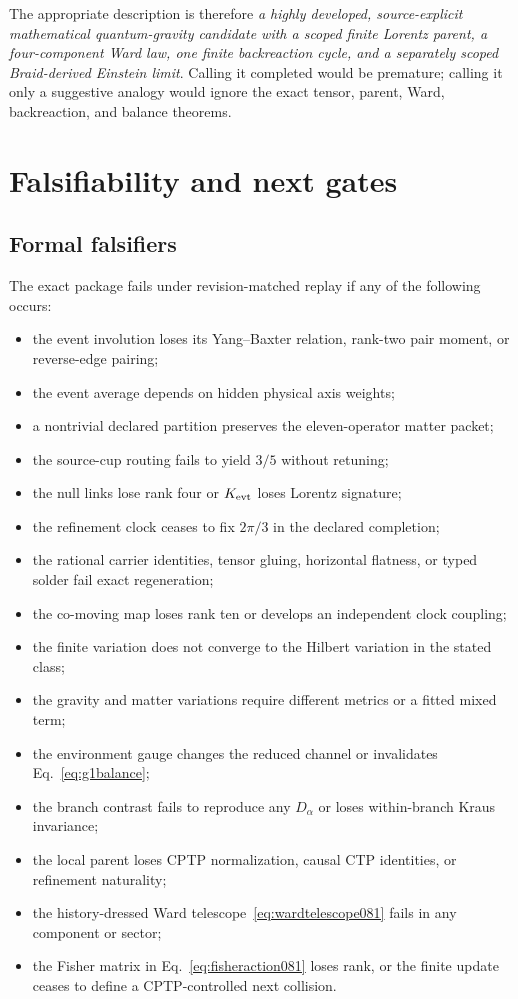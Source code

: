\documentclass[11pt]{article}
\theoremstyle{definition}
\theoremstyle{remark}
\begin{document}
The appropriate description is therefore \emph{a highly developed, source-explicit mathematical quantum-gravity candidate with a scoped finite Lorentz parent, a four-component Ward law, one finite backreaction cycle, and a separately scoped Braid-derived Einstein limit}. Calling it completed would be premature; calling it only a suggestive analogy would ignore the exact tensor, parent, Ward, backreaction, and balance theorems.

\section{Falsifiability and next gates}

\subsection{Formal falsifiers}

The exact package fails under revision-matched replay if any of the following occurs:
\begin{itemize}
\item the event involution loses its Yang--Baxter relation, rank-two pair moment, or reverse-edge pairing;
\item the event average depends on hidden physical axis weights;
\item a nontrivial declared partition preserves the eleven-operator matter packet;
\item the source-cup routing fails to yield $3/5$ without retuning;
\item the null links lose rank four or $K_{\rm evt}$ loses Lorentz signature;
\item the refinement clock ceases to fix $2\pi/3$ in the declared completion;
\item the rational carrier identities, tensor gluing, horizontal flatness, or typed solder fail exact regeneration;
\item the co-moving map loses rank ten or develops an independent clock coupling;
\item the finite variation does not converge to the Hilbert variation in the stated class;
\item the gravity and matter variations require different metrics or a fitted mixed term;
\item the environment gauge changes the reduced channel or invalidates Eq.~\eqref{eq:g1balance};
\item the branch contrast fails to reproduce any $D_\alpha$ or loses within-branch Kraus invariance;
\item the local parent loses CPTP normalization, causal CTP identities, or refinement naturality;
\item the history-dressed Ward telescope~\eqref{eq:wardtelescope081} fails in any component or sector;
\item the Fisher matrix in Eq.~\eqref{eq:fisheraction081} loses rank, or the finite update ceases to define a CPTP-controlled next collision.
\end{itemize}
\end{document}
